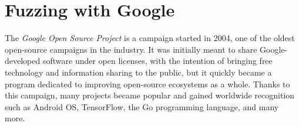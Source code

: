 \newpage
\section{Fuzzing with Google}
The \textit{Google Open Source Project} \cite{google_oss} is a campaign started in 2004, one of the oldest open-source campaigns in the industry. 
\newline
It was initially meant to share Google-developed software under open licenses, with the intention of bringing free technology and information sharing to the public, but it quickly became a program dedicated to improving open-source ecosystems as a whole. 
\newline \newline
Thanks to this campaign, many projects became popular and gained worldwide recognition such as Android OS, TensorFlow, the Go programming language, and many more.

\ \\
